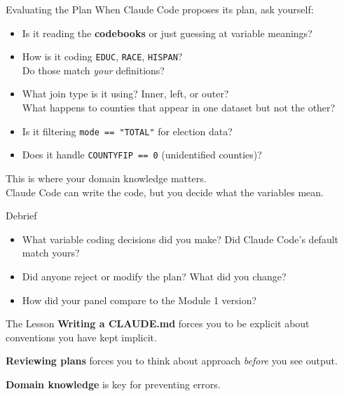 \begin{frame}{Evaluating the Plan}
  When Claude Code proposes its plan, ask yourself:

  \vspace{0.5em}
  \begin{itemize}
    \item Is it reading the \textbf{codebooks} or just guessing at variable meanings?
    \item How is it coding \texttt{EDUC}, \texttt{RACE}, \texttt{HISPAN}?\\
      {\small Do those match \textit{your} definitions?}
    \item What join type is it using? Inner, left, or outer?\\
      {\small What happens to counties that appear in one dataset but not the other?}
    \item Is it filtering \texttt{mode == "TOTAL"} for election data?
    \item Does it handle \texttt{COUNTYFIP == 0} (unidentified counties)?
  \end{itemize}

  \vspace{0.5em}
  \alert{This is where your domain knowledge matters.}\\
  Claude Code can write the code, but you decide what the variables mean.
\end{frame}


\begin{frame}{Debrief}
  \begin{itemize}
    \item What variable coding decisions did you make? Did Claude Code's default match yours?
    \item Did anyone reject or modify the plan? What did you change?
    \item How did your panel compare to the Module 1 version?
  \end{itemize}

  \vspace{0.8em}
  \begin{block}{The Lesson}
    \textbf{Writing a CLAUDE.md} forces you to be explicit about conventions you have kept implicit.

    \vspace{0.3em}
    \textbf{Reviewing plans} forces you to think about approach \textit{before} you see output.

    \vspace{0.3em}
    \textbf{Domain knowledge} is key for preventing errors.
  \end{block}
\end{frame}

